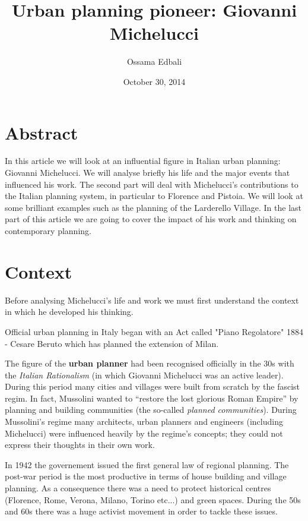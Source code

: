 \documentclass[a4paper,11pt]{article}
\author{Ossama Edbali}
\title{Urban planning pioneer: Giovanni Michelucci}
\date{October 30, 2014}
\begin{document}
\maketitle
\tableofcontents
\newpage

\section{Abstract}
In this article we will look at an influential figure in Italian urban planning: Giovanni Michelucci.
We will analyse briefly his life and the major events that influenced his work.
The second part will deal with Michelucci's contributions to the Italian planning system, in particular
to Florence and Pistoia. We will look at some brilliant examples such as the planning of the Larderello Village.
In the last part of this article we are going to cover the impact of his work and thinking on contemporary planning.

\section{Context}
Before analysing Michelucci's life and work we must first understand the context in which he developed his thinking.

Official urban planning in Italy began with an Act called "Piano Regolatore" 1884 - Cesare Beruto which has planned the extension of Milan.

The figure of the \textbf{urban planner} had been recognised officially in the 30s with the \emph{Italian Rationalism} (in which Giovanni Michelucci was an active leader). During this period many cities and villages were built from scratch by the fascist regim. In fact, Mussolini wanted to ``restore the lost glorious Roman Empire'' by planning and building communities (the so-called \emph{planned communities}). During Mussolini's regime many architects, urban planners and engineers (including Michelucci) were influenced heavily by the regime's concepts; they could not express their thoughts in their own work.

In 1942 the governement issued the first general law of regional planning. The post-war period is the most productive in terms of house building and village planning. As a consequence there was a need to protect historical centres (Florence, Rome, Verona, Milano, Torino etc...) and green spaces. During the 50s and 60s there was a huge activist movement in order to tackle these issues.
\end{document}
